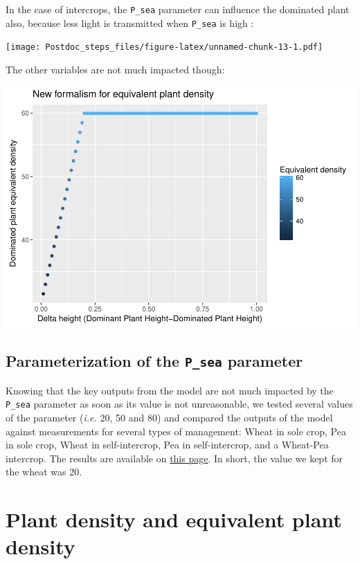 \documentclass[
]{book}
\begin{document}
In the case of intercrops, the \texttt{P\_sea} parameter can influence the dominated plant also, because less light is transmitted when \texttt{P\_sea} is high :

\texttt{[image: Postdoc\_steps\_files/figure-latex/unnamed-chunk-13-1.pdf]}

The other variables are not much impacted though:

\includegraphics{Postdoc_steps_files/figure-latex/unnamed-chunk-14-1.pdf}

\hypertarget{parameterization-of-the-p_sea-parameter}{%
\section{\texorpdfstring{Parameterization of the \texttt{P\_sea} parameter}{Parameterization of the P\_sea parameter}}\label{parameterization-of-the-p_sea-parameter}}

Knowing that the key outputs from the model are not much impacted by the \texttt{P\_sea} parameter as soon as its value is not unreasonable, we tested several values of the parameter (\emph{i.e.} 20, 50 and 80) and compared the outputs of the model against measurements for several types of management: Wheat in sole crop, Pea in sole crop, Wheat in self-intercrop, Pea in self-intercrop, and a Wheat-Pea intercrop.
The results are available on \href{Wheat_EAI.html}{this page}. In short, the value we kept for the wheat was 20.

\hypertarget{plantdensity}{%
\chapter{Plant density and equivalent plant density}\label{plantdensity}}
\end{document}
